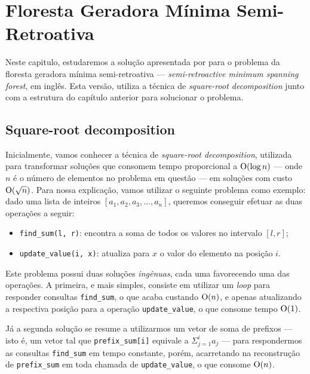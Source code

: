 
\chapter{Floresta Geradora Mínima Semi-Retroativa}
\label{cap:retroactive-msf}

Neste capitulo, estudaremos a solução apresentada por \citet{10.1093/comjnl/bxaa135} para o problema da floresta geradora mínima semi-retroativa --- \emph{semi-retroactive minimum spanning forest}, em inglês. Esta versão, utiliza a técnica de \emph{square-root decomposition} junto com a estrutura do capítulo anterior para solucionar o problema.

\section{Square-root decomposition}
\label{sec:sqrt-decomp}

Inicialmente, vamos conhecer a técnica de \emph{square-root decomposition}, utilizada para transformar soluções que consomem tempo proporcional a $\mathrm{O}(\log n)$ --- onde $n$ é o número de elementos no problema em questão --- em soluções com custo $\mathrm{O}(\sqrt{n})$. Para nossa explicação, vamos utilizar o seguinte problema como exemplo: dado uma lista de inteiros $ [ a_1, a_2, a_3, \dots, a_n ] $, queremos conseguir efetuar as duas operações a seguir:

\begin{itemize}
    \item \texttt{find\_sum(l, r)}: encontra a soma de todos os valores no intervalo $[l,r]$;
    \item \texttt{update\_value(i, x)}: atualiza para $x$ o valor do elemento na posição $i$.
\end{itemize}

Este problema possui duas soluções \emph{ingênuas}, cada uma favorecendo uma das operações. A primeira, e mais simples, consiste em utilizar um \emph{loop} para responder consultas \texttt{find\_sum}, o que acaba custando $\mathrm{O}(n)$, e apenas atualizando a respectiva posição para a operação \texttt{update\_value}, o que consome tempo $\mathrm{O}(1)$.

Já a segunda solução se resume a utilizarmos um vetor de soma de prefixos --- isto é, um vetor tal que \texttt{prefix\_sum[i]} equivale a $\Sigma_{j=1}^{i} a_j$ --- para respondermos as consultas \texttt{find\_sum} em tempo constante, porém, acarretando na reconstrução de \texttt{prefix\_sum} em toda chamada de \texttt{update\_value}, o que consome $\mathrm{O}(n)$.

